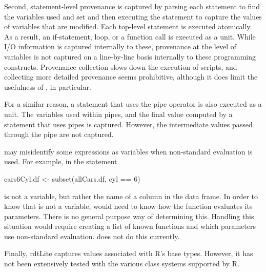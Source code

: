 Second, statement-level provenance is captured by parsing each statement to find the variables used and set and then executing the statement to capture the values of variables that are modified.  Each top-level statement is executed atomically.  As a result, an if-statement, loop, or a function call is executed as a unit.  While I/O information is captured internally to these, provenance at the level of variables is not captured on a line-by-line basis internally to these programming constructs.  Provenance collection slows down the execution of scripts, and collecting more detailed provenance seems prohibitive, although it does limit the usefulness of , in particular.

For a similar reason, a statement that uses the pipe operator is also executed as a unit.  The variables used within pipes, and the final value computed by a statement that uses pipes is captured.  However, the intermediate values passed through the pipe are not captured.

 may misidentify some expressions as variables when non-standard evaluation is used.  For example, in the statement

\begin{example}
cars6Cyl.df <- subset(allCars.df, cyl == 6)
\end{example}

 is not a variable, but rather the name of a column in the  data frame.  In order to know that  is not a variable,  would need to know how the  function evaluates its parameters.  There is no general purpose way of determining this. Handling this situation would require creating a list of known functions and which parameters use non-standard evaluation.   does not do this currently.  

Finally, rdtLite captures values associated with R's base types.  However, it has not been extensively tested with the various class systems supported by R.

